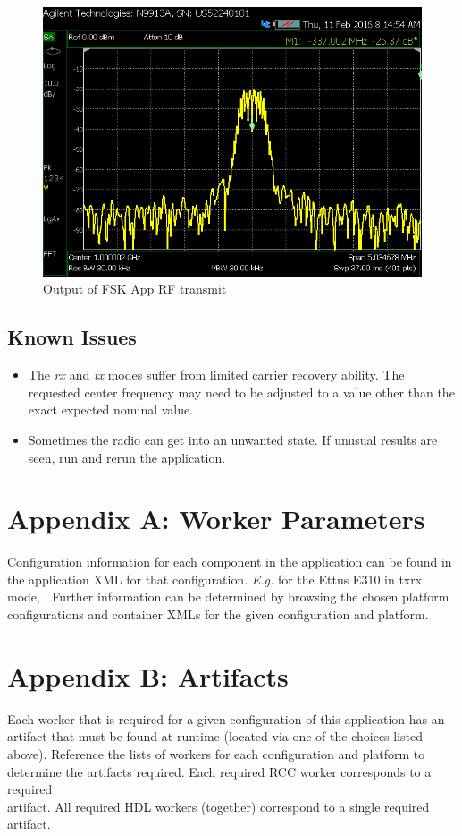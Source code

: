 \begin{figure}[ht]
\begin{minipage}{.45\textwidth}
			\centering\includegraphics[width=1.0\linewidth]{tx_spec_an}
			\caption{Output of FSK App RF transmit}
			\label{fig:tx_spec_an}
		\end{minipage}
	\end{figure}
\pagebreak
\subsection{Known Issues}
\noindent
\begin{itemize}
  \item The \textit{rx} and \textit{tx} modes suffer from limited carrier recovery ability. The requested center frequency may need to be adjusted to a value other than the exact expected nominal value.
  \item Sometimes the radio can get into an unwanted state. If unusual results are seen, run  and rerun the application.
\end{itemize}

\pagebreak
\section{Appendix A: Worker Parameters}
Configuration information for each component in the application can be found in the application XML for that configuration. \textit{E.g.} for the Ettus E310 in txrx mode, . Further information can be determined by browsing the chosen platform configurations and container XMLs for the given configuration and platform.
\section{Appendix B: Artifacts}
Each worker that is required for a given configuration of this application has an artifact that must be found at runtime (located via one of the  choices listed above). Reference the lists of workers for each configuration and platform to determine the artifacts required. Each required RCC worker corresponds to a required \\
 artifact. All required HDL workers (together) correspond to a single required  artifact.\\
